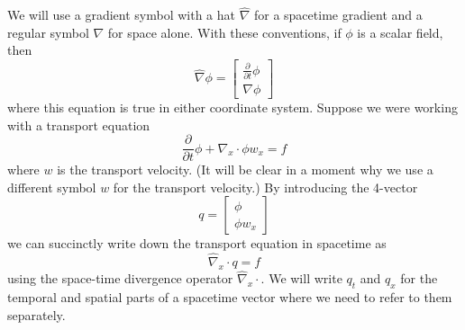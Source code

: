 \documentclass[gmd, manuscript]{copernicus}
\begin{document}
We will use a gradient symbol with a hat $\hat{\nabla}$ for a spacetime gradient and a regular symbol $\nabla$ for space alone.
With these conventions, if $\phi$ is a scalar field, then
\begin{equation}
    \hat{\nabla}\phi = \left[\begin{matrix}\frac{\partial}{\partial t}\phi \\ \nabla\phi\end{matrix}\right]
\end{equation}
where this equation is true in either coordinate system.
Suppose we were working with a transport equation
\begin{equation}
    \frac{\partial}{\partial t}\phi + \nabla_x\cdot \phi w_x = f
    \label{eq:transport}
\end{equation}
where $w$ is the transport velocity.
(It will be clear in a moment why we use a different symbol $w$ for the transport velocity.)
By introducing the 4-vector
\begin{equation}
    q = \left[\begin{matrix}\phi \\ \phi w_x\end{matrix}\right]
\end{equation}
we can succinctly write down the transport equation in spacetime as
\begin{equation}
    \hat{\nabla}_x\cdot q = f
    \label{eq:4div}
\end{equation}
using the space-time divergence operator $\hat{\nabla}_x\cdot$.
We will write $q_t$ and $q_x$ for the temporal and spatial parts of a spacetime vector where we need to refer to them separately.
\end{document}
